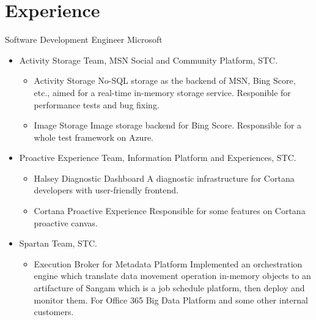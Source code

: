 \documentclass[10pt,a4paper,roman]{moderncv} %
\begin{document}
\makecvtitle

\vspace{-1cm}

\section{Experience}
        {Software Development Engineer}
        {}
        {Microsoft}
        {}
        {\begin{itemize}%
         \item Activity Storage Team, MSN Social and Community Platform, STC.
               \begin{itemize}%
               \item Activity Storage\newline{}%
                     No-SQL storage as the backend of MSN, Bing Score, etc., aimed for a real-time in-memory storage service.\newline{}%
                     Responible for performance tests and bug fixing.
               \item Image Storage\newline{}%
                     Image storage backend for Bing Score.\newline{}%
                     Responsible for a whole test framework on Azure.
               \end{itemize}
         \item Proactive Experience Team, Information Platform and Experiences, STC.
               \begin{itemize}%
               \item Halsey Diagnostic Dashboard\newline{}%
                     A diagnostic infrastructure for Cortana developers with user-friendly frontend.
               \item Cortana Proactive Experience\newline{}%
                     Responsible for some features on Cortana proactive canvas.
               \end{itemize}
         \item Spartan Team, STC.
               \begin{itemize}%
               \item Execution Broker for Metadata Platform\newline{}%
                     Implemented an orchestration engine which translate data movement operation in-memory objects to an artifacture of Sangam which is a job schedule platform, then deploy and monitor them. For Office 365 Big Data Platform and some other internal customers.
               \end{itemize}
         \end{itemize}}
\end{document}
